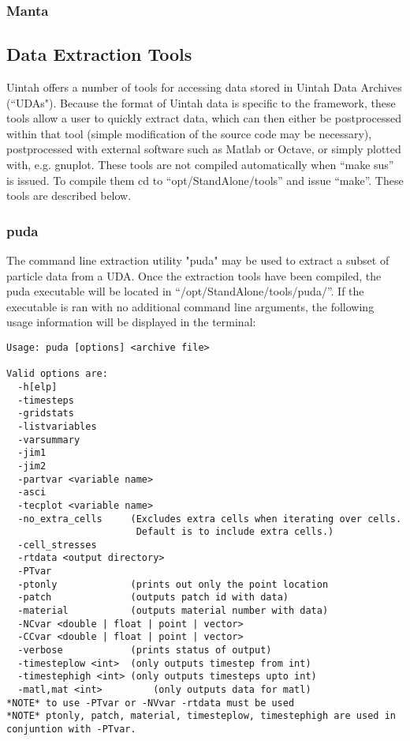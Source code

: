 \subsubsection{Manta}

\subsection{Data Extraction Tools}

Uintah offers a number of tools for accessing data stored in Uintah Data
Archives (``UDAs").  Because the format of Uintah data is specific to the
framework, these tools allow a user to quickly extract data, which can then
either be postprocessed within that tool (simple modification of the source
code may be necessary), postprocessed with external software such as
Matlab or Octave, or simply plotted with, e.g. gnuplot.  These tools are not compiled automatically when ``make sus'' is issued.  To compile them cd to ``opt/StandAlone/tools'' and issue ``make''.  These tools
are described below.

\subsubsection{puda}

The command line extraction utility "puda" may be used to extract a subset of particle data from a UDA.  Once the extraction tools have been compiled, the puda executable will be located in ``/opt/StandAlone/tools/puda/''.  If the executable is ran with no additional command line arguments, the following usage information will be displayed in the terminal:

\begin{verbatim}
Usage: puda [options] <archive file>

Valid options are:
  -h[elp]
  -timesteps
  -gridstats
  -listvariables
  -varsummary
  -jim1
  -jim2
  -partvar <variable name>
  -asci
  -tecplot <variable name>
  -no_extra_cells     (Excludes extra cells when iterating over cells.
                       Default is to include extra cells.)
  -cell_stresses
  -rtdata <output directory>
  -PTvar
  -ptonly             (prints out only the point location
  -patch              (outputs patch id with data)
  -material           (outputs material number with data)
  -NCvar <double | float | point | vector>
  -CCvar <double | float | point | vector>
  -verbose            (prints status of output)
  -timesteplow <int>  (only outputs timestep from int)
  -timestephigh <int> (only outputs timesteps upto int)
  -matl,mat <int>         (only outputs data for matl)
*NOTE* to use -PTvar or -NVvar -rtdata must be used
*NOTE* ptonly, patch, material, timesteplow, timestephigh are used in conjuntion with -PTvar.
\end{verbatim}

